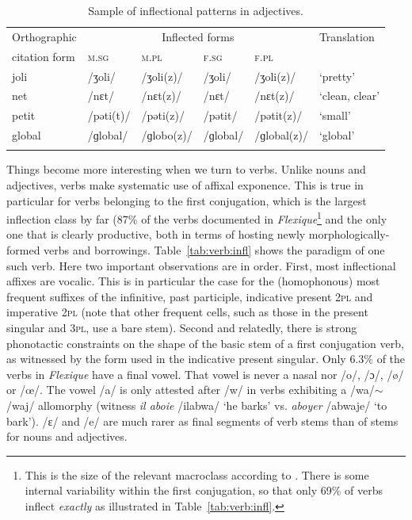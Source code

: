 \documentclass[output=paper,colorlinks,citecolor=brown]{langscibook}
\begin{document}
\begin{table}
	\centering
	\begin{tabular}{llllll}
		\lsptoprule
		Orthographic & \multicolumn{4}{c}{Inflected forms} & Translation \\
		citation form & \textsc{m.sg} & \textsc{m.pl} & \textsc{f.sg} &   \textsc{f.pl} & \\
		\midrule
		joli & /ʒoli/ & /ʒoli(z)/ & /ʒoli/ & /ʒoli(z)/ & ‘pretty’\\
		net & /nɛt/ &/nɛt(z)/ & /nɛt/ & /nɛt(z)/ & ‘clean, clear’\\
		petit & /pəti(t)/ & /pəti(z)/ & /pətit/ & /pətit(z)/ & ‘small’\\
		global & /ɡlobal/ & /ɡlobo(z)/ & /ɡlobal/ & /ɡlobal(z)/ & ‘global’\\
		\lspbottomrule
	\end{tabular}
	\caption{Sample of inflectional patterns in  adjectives.\label{tab:adj:infl}}
\end{table}

Things become more interesting when we turn to verbs. Unlike nouns and adjectives,  verbs make systematic use of affixal exponence. This is true in particular for verbs belonging to the first conjugation, which is the largest inflection class by far (87\% of the verbs documented in \emph{Flexique}\footnote{This is the size of the relevant macroclass according to \citet{beniaminebonamisagot2017}. There is some internal variability within the first conjugation, so that only 69\% of verbs inflect \emph{exactly} as illustrated in Table~\ref{tab:verb:infl}.} and the only one that is clearly productive, both in terms of hosting newly morphologically-formed verbs and borrowings. Table~\ref{tab:verb:infl} shows the paradigm of one such verb. Here two important observations are in order. First, most inflectional affixes are vocalic. This is in particular the case for the (homophonous) most frequent suffixes of the infinitive, past participle, indicative present \textsc{2pl} and imperative \textsc{2pl} (note that other frequent cells, such as those in the present singular and \textsc{3pl}, use a bare stem). Second and relatedly, there is strong phonotactic constraints on the shape of the basic stem of a first conjugation verb, as witnessed by the form used in the indicative present singular. Only 6.3\% of the verbs in \emph{Flexique} have a final vowel. That vowel is never a nasal nor /o/, /ɔ/, /ø/ or /œ/. The vowel /a/ is only attested after /w/ in verbs exhibiting a /wa/$\sim$/waj/ allomorphy (witness \emph{il aboie} /ilabwa/ ‘he barks’ vs. \emph{aboyer} /abwaje/ ‘to bark’).  /ɛ/ and /e/ are much rarer as final segments of verb stems than of stems for nouns and adjectives.
\end{document}
